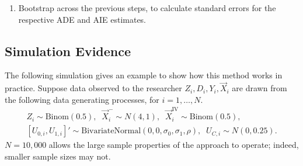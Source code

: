 \begin{enumerate}
    \item Bootstrap across the previous steps, to calculate standard errors for the respective ADE and AIE estimates.
\end{enumerate}

\subsection{Simulation Evidence}
The following simulation gives an example to show how this method works in practice.
Suppose data observed to the researcher $Z_i, D_i, Y_i, \vec X_i$ are drawn from the following data generating processes, for $i = 1, \hdots, N$.
\begin{align*}
    Z_i \sim \text{Binom}\left(0.5 \right),
    \;\; \vec X_i^- \sim N(4, 1),
    \;\; \vec X_i^{\text{IV}} \sim \text{Binom}\left( 0.5 \right), \\
    \left[ U_{0,i}, U_{1,i} \right]' \sim
    \text{BivariateNormal}\left( 0, 0, \sigma_0, \sigma_1, \rho \right),
    \;\; U_{C,i} \sim N(0, 0.25).
\end{align*}
$N = 10,000$ allows the large sample properties of the approach to operate; indeed, smaller sample sizes may not.

